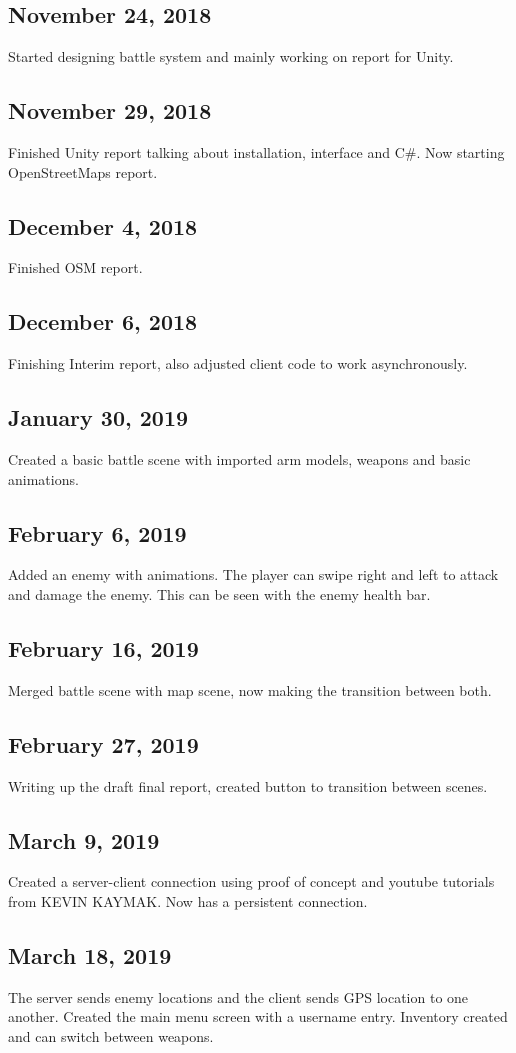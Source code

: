\documentclass[a4paper]{report}
\begin{document}
\subsection{November 24, 2018}
Started designing battle system and mainly working on report for Unity.
\subsection{November 29, 2018}
Finished Unity report talking about installation, interface and C\#. Now starting OpenStreetMaps report.
\subsection{December 4, 2018}
Finished OSM report.
\subsection{December 6, 2018}
Finishing Interim report, also adjusted client code to work asynchronously.
\subsection{January 30, 2019}
Created a basic battle scene with imported arm models, weapons and basic animations.
\subsection{February 6, 2019}
Added an enemy with animations. The player can swipe right and left to attack and damage the enemy. This can be seen with the enemy health bar.
\subsection{February 16, 2019}
Merged battle scene with map scene, now making the transition between both.
\subsection{February 27, 2019}
Writing up the draft final report, created button to transition between scenes.
\subsection{March 9, 2019}
Created a server-client connection using proof of concept and youtube tutorials from KEVIN KAYMAK. Now has a persistent connection.
\subsection{March 18, 2019}
The server sends enemy locations and the client sends GPS location to one another. Created the main menu screen with a username entry. Inventory created and can switch between weapons.
\end{document}
